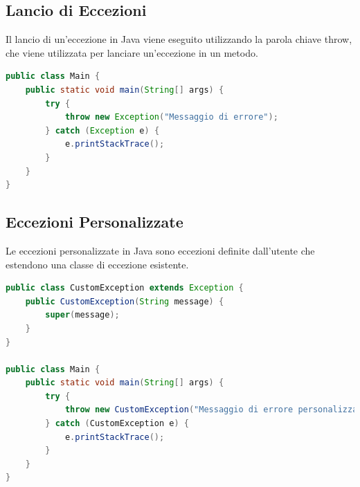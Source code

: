 \documentclass[11pt]{article}
\begin{document}
\subsection{Lancio di Eccezioni}
Il lancio di un'eccezione in Java viene eseguito utilizzando la parola chiave throw, che viene utilizzata per lanciare un'eccezione in un metodo.
\begin{lstlisting}[language=Java]
public class Main {
    public static void main(String[] args) {
        try {
            throw new Exception("Messaggio di errore");
        } catch (Exception e) {
            e.printStackTrace();
        }
    }
}
\end{lstlisting}
\subsection{Eccezioni Personalizzate}
Le eccezioni personalizzate in Java sono eccezioni definite dall'utente che estendono una classe di eccezione esistente.
\begin{lstlisting}[language=Java]
public class CustomException extends Exception {
    public CustomException(String message) {
        super(message);
    }
}

public class Main {
    public static void main(String[] args) {
        try {
            throw new CustomException("Messaggio di errore personalizzato");
        } catch (CustomException e) {
            e.printStackTrace();
        }
    }
}
\end{lstlisting}
\end{document}
